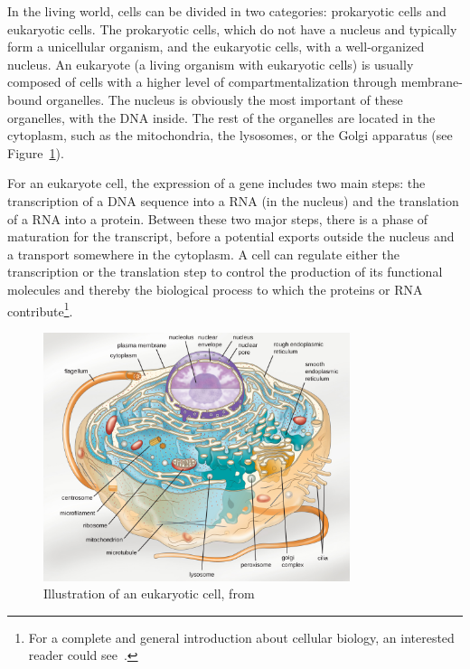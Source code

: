 In the living world, cells can be divided in two categories: prokaryotic cells and eukaryotic cells.
The prokaryotic cells, which do not have a nucleus and typically form a unicellular organism, and the eukaryotic cells, with a well-organized nucleus.
An eukaryote (a living organism with eukaryotic cells) is usually composed of cells with a higher level of compartmentalization through membrane-bound organelles.
The nucleus is obviously the most important of these organelles, with the \ac{DNA} inside.
The rest of the organelles are located in the cytoplasm, such as the mitochondria, the lysosomes, or the Golgi apparatus (see Figure~\ref{fig:eukaryotic_cell}).

For an eukaryote cell, the expression of a gene includes two main steps: the transcription of a \ac{DNA} sequence into a \ac{RNA} (in the nucleus) and the translation of a \ac{RNA} into a protein.
Between these two major steps, there is a phase of maturation for the transcript, before a potential exports outside the nucleus and a transport somewhere in the cytoplasm.
A cell can regulate either the transcription or the translation step to control the production of its functional molecules and thereby the biological process to which the proteins or \ac{RNA} contribute\footnote{For a complete and general introduction about cellular biology, an interested reader could see~\cite{alberts_molecular_2017}.}.

\begin{figure}[]
    \centering
    \includegraphics[width=0.8\textwidth]{figures/introduction/cell_eukaryotic.jpg}
    \caption[Illustration of an eukaryotic cell]{Illustration of an eukaryotic cell, from~\cite{parker2017microbiology}}
    \label{fig:eukaryotic_cell}
\end{figure}

